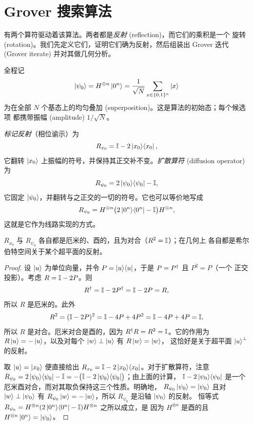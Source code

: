 \section{Grover 搜索算法}
\label{sec:lec03-3}

有两个算符驱动着该算法。两者都是\emph{反射} (reflection)，而它们的乘积是一个
旋转 (rotation)。我们先定义它们，证明它们确为反射，然后组装出 Grover 迭代
(Grover iterate) 并对其做几何分析。

全程记
\[
  \ket{\psi_0}=H^{\otimes n}\ket{0^{n}}=\frac{1}{\sqrt N}\sum_{x\in\{0,1\}^{n}}\ket{x}
\]
为在全部 $N$ 个基态上的均匀叠加 (superposition)。这是算法的初始态；每个候选项
都携带振幅 (amplitude) $1/\sqrt N$。

\begin{definition}[标记反射与扩散算符]
\label{def:lec03-reflections}
\emph{标记反射}（相位谕示）为
\[
  R_{x_0}=\mathbb{I}-2\ket{x_0}\!\bra{x_0},
\]
它翻转 $\ket{x_0}$ 上振幅的符号，并保持其正交补不变。\emph{扩散算符}
(diffusion operator) 为
\[
  R_{\psi_0}=2\ket{\psi_0}\!\bra{\psi_0}-\mathbb{I},
\]
它固定 $\ket{\psi_0}$，并翻转与之正交的一切的符号。它也可以等价地写成
\[
  R_{\psi_0}=H^{\otimes n}\bigl(2\ket{0^{n}}\!\bra{0^{n}}-\mathbb{I}\bigr)H^{\otimes n},
\]
这就是它作为线路实现的方式。
\end{definition}

\begin{lemma}[两个算符都是反射]
\label{lem:lec03-reflections}
$R_{x_0}$ 与 $R_{\psi_0}$ 各自都是厄米的、酉的，且为对合（$R^2=\mathbb{I}$）；在几何上
各自都是希尔伯特空间关于某个超平面的反射。
\end{lemma}

\begin{proof}
设 $\ket{u}$ 为单位向量，并令 $P=\ket{u}\!\bra{u}$，于是 $P=P^{\dagger}$ 且 $P^{2}=P$（一个
正交投影）。考虑 $R=\mathbb{I}-2P$。则
\[
  R^{\dagger}=\mathbb{I}-2P^{\dagger}=\mathbb{I}-2P=R,
\]
所以 $R$ 是厄米的。此外
\[
  R^{2}=(\mathbb{I}-2P)^{2}=\mathbb{I}-4P+4P^{2}=\mathbb{I}-4P+4P=\mathbb{I},
\]
所以 $R$ 是对合。厄米对合是酉的，因为 $R^{\dagger} R=R^{2}=\mathbb{I}$。它的作用为
$R\ket{u}=-\ket{u}$，以及对每个 $\ket{w}\perp\ket{u}$ 有 $R\ket{w}=\ket{w}$，
这恰好是关于超平面 $\ket{u}^{\perp}$ 的反射。

取 $\ket{u}=\ket{x_0}$ 便直接给出 $R_{x_0}=\mathbb{I}-2\ket{x_0}\!\bra{x_0}$。对于扩散算符，注意
$R_{\psi_0}=2\ket{\psi_0}\!\bra{\psi_0}-\mathbb{I}=-\bigl(\mathbb{I}-2\ket{\psi_0}\!\bra{\psi_0}\bigr)$；由上面的计算，
$\mathbb{I}-2\ket{\psi_0}\!\bra{\psi_0}$ 是一个厄米酉对合，而对其取负保持这三个性质。明确地，
$R_{\psi_0}\ket{\psi_0}=\ket{\psi_0}$ 且对 $\ket{w}\perp\ket{\psi_0}$ 有
$R_{\psi_0}\ket{w}=-\ket{w}$，所以 $R_{\psi_0}$ 是沿轴 $\ket{\psi_0}$ 的反射。
恒等式 $R_{\psi_0}=H^{\otimes n}(2\ket{0^{n}}\!\bra{0^{n}}-\mathbb{I})H^{\otimes n}$ 之所以成立，是
因为 $H^{\otimes n}$ 是酉的且 $H^{\otimes n}\ket{0^{n}}=\ket{\psi_0}$。
\end{proof}

